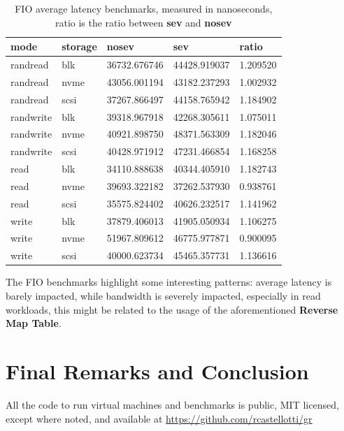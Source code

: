 \documentclass[twocolumn]{article}
\begin{document}
\begin{table}
    \small
    \label{tab:al}
    \begin{tabular}{lllll}
        \hline
        \textbf{mode}& \textbf{storage} & \textbf{nosev} & \textbf{sev} & \textbf{ratio} \\
        \hline
        randread & blk & 36732.676746 & 44428.919037 & 1.209520 \\
        randread & nvme & 43056.001194 & 43182.237293 & 1.002932 \\
        randread & scsi & 37267.866497 & 44158.765942 & 1.184902 \\
        randwrite & blk & 39318.967918 & 42268.305611 & 1.075011 \\
        randwrite & nvme & 40921.898750 & 48371.563309 & 1.182046 \\
        randwrite & scsi & 40428.971912 & 47231.466854 & 1.168258 \\
        read & blk & 34110.888638 & 40344.405910 & 1.182743 \\
        read & nvme & 39693.322182 & 37262.537930 & 0.938761 \\
        read & scsi & 35575.824402 & 40626.232517 & 1.141962 \\
        write & blk & 37879.406013 & 41905.050934 & 1.106275 \\
        write & nvme & 51967.809612 & 46775.977871 & 0.900095 \\
        write & scsi & 40000.623734 & 45465.357731 & 1.136616 \\
        \hline
    \end{tabular}
    \caption{FIO average latency benchmarks, measured in nanoseconds, ratio is the ratio between \textbf{sev} and \textbf{nosev}}
\end{table}

The FIO benchmarks highlight some interesting patterns: average latency is barely impacted, while bandwidth is severely impacted, especially in read workloads, this might be related to the usage of the aforementioned \textbf{Reverse Map Table}.

\section{Final Remarks and Conclusion}
All the code to run virtual machines and benchmarks is public, MIT licensed, except where noted, and available at \href{https://github.com/rcastellotti/gr}{https://github.com/rcastellotti/gr}
\end{document}
